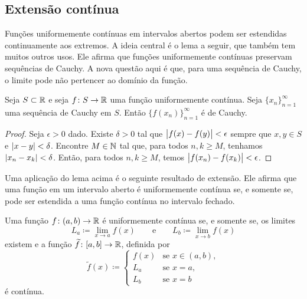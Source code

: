 \subsection{Extensão contínua}

Funções uniformemente contínuas em intervalos abertos podem ser estendidas
continuamente aos extremos.
A ideia central é o lema a seguir, que também tem muitos outros usos.
Ele afirma que funções uniformemente contínuas preservam sequências de Cauchy.
A nova questão aqui é que, para uma sequência de Cauchy,
o limite pode não pertencer ao domínio da função.

\begin{lemma} \label{unifcauchycauchy:lemma}
Seja $S \subset {\mathbb{R}}$ e seja $f \colon S \to {\mathbb{R}}$ uma função uniformemente contínua.
Seja $\{ x_n \}_{n=1}^\infty$ uma sequência de Cauchy em $S$.
Então $\bigl\{ f(x_n) \bigr\}_{n=1}^\infty$ é de Cauchy.
\end{lemma}

\begin{proof}
Seja $\epsilon > 0$ dado. Existe $\delta > 0$ tal que
$\bigl\lvert {f(x)-f(y)} \bigr\rvert < \epsilon$ sempre que $x,y \in S$ e
$\lvert {x-y} \rvert < \delta$. Encontre $M \in {\mathbb{N}}$ tal que, para todos $n,k \geq M$,
tenhamos $\lvert {x_n-x_k} \rvert < \delta$.
Então, para todos $n,k \geq M$, temos $\bigl\lvert {f(x_n)-f(x_k)} \bigr\rvert < \epsilon$.
\end{proof}

Uma aplicação do lema acima é o seguinte resultado de extensão. Ele afirma que
uma função em um intervalo aberto é uniformemente contínua se, e somente se,
pode ser estendida a uma função contínua no intervalo fechado.

\begin{prop} \label{context:prop}
Uma função $f \colon (a,b) \to {\mathbb{R}}$ é uniformemente contínua se, e somente se,
os limites
\begin{equation*}
L_a \coloneqq \lim_{x \to a} f(x) \qquad \text{e} \qquad
L_b \coloneqq \lim_{x \to b} f(x)
\end{equation*}
existem e a função $\widetilde{f} \colon [a,b] \to {\mathbb{R}}$,
definida por
\begin{equation*}
\widetilde{f}(x) \coloneqq
\begin{cases}
f(x) & \text{se } x \in (a,b), \\
L_a & \text{se } x = a, \\
L_b & \text{se } x = b
\end{cases}
\end{equation*}
é contínua.
\end{prop}

